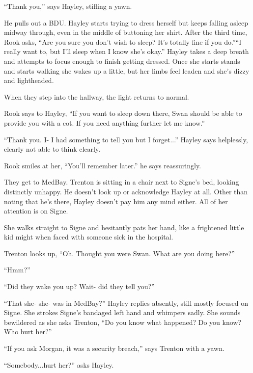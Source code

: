 ``Thank you,'' says Hayley, stifling a yawn.

He pulls out a BDU.  Hayley starts trying to dress herself but keeps falling asleep midway through, even in the middle of buttoning her shirt.  After the third time, Rook asks, ``Are you sure you don't wish to sleep?  It's totally fine if you do.''``I really want to, but I'll sleep when I know she's okay.''  Hayley takes a deep breath and attempts to focus enough to finish getting dressed.  Once she starts stands and starts walking she wakes up a little, but her limbs feel leaden and she's dizzy and lightheaded.  



When they step into the hallway, the light returns to normal.

Rook says to Hayley, ``If you want to sleep down there, Swan should be able to provide you with a cot.  If you need anything further let me know.''

``Thank you.  I- I had something to tell you but I forget...'' Hayley says helplessly, clearly not able to think clearly.

Rook smiles at her, ``You'll remember later.'' he says reassuringly.





They get to MedBay.  Trenton is sitting in a chair next to Signe's bed, looking distinctly unhappy.  He doesn't look up or acknowledge Hayley at all.  Other than noting that he's there, Hayley doesn't pay him any mind either.  All of her attention is on Signe.



She walks straight to Signe and hesitantly pats her hand, like a frightened little kid might when faced with someone sick in the hospital.

Trenton looks up, ``Oh.  Thought you were Swan.  What are you doing here?''

``Hmm?''

``Did they wake you up?  Wait- did they tell you?''

``That she- she- was in MedBay?'' Hayley replies absently, still mostly focused on Signe.  She strokes Signe's bandaged left hand and whimpers sadly.  She sounds bewildered as she asks Trenton, ``Do you know what happened?  Do you know?  Who hurt her?''

``If you ask Morgan, it was a security breach,'' says Trenton with a yawn.

``Somebody...hurt her?'' asks Hayley.

